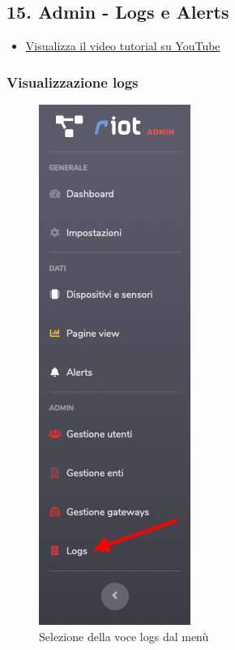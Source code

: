 \newpage \subsection{15. Admin - Logs e Alerts}

	\begin{itemize}
		\item \href{https://www.youtube.com/watch?v=PjySMOLCtMA&list=PLPKYjnuIh1FA3b3jn_bwY_ztYzaFn2mIT&index=18}{Visualizza il video tutorial su YouTube} 
	\end{itemize}
	
	\subsubsection{Visualizzazione logs}

	\begin{figure}[H]
		\centering
		\includegraphics[scale=0.600]{res/images/admin/menuLogs.png}
		\caption{Selezione della voce logs dal menù}
	\end{figure}

